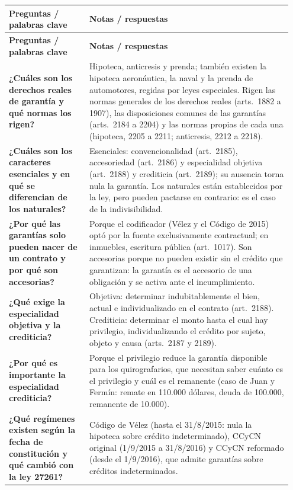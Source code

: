 \documentclass[12pt,oneside]{book}
\makeatletter
\newenvironment{cornell}{%
    \par\vspace{0.5em}
    \noindent
    \begin{longtable}{@{}>{\raggedright\arraybackslash}p{0.27\linewidth}
                         >{\raggedright\arraybackslash}p{0.68\linewidth}@{}}
    \toprule
    \textbf{Preguntas / palabras clave} & \textbf{Notas / respuestas} \\
    \midrule
    \endfirsthead
    \toprule
    \textbf{Preguntas / palabras clave} & \textbf{Notas / respuestas} \\
    \midrule
    \endhead
}{%
    \bottomrule
    \end{longtable}
}
\makeatother
\begin{document}
\begin{cornell}
\textbf{¿Cuáles son los derechos reales de garantía y qué normas los rigen?} &
Hipoteca, anticresis y prenda; también existen la hipoteca aeronáutica, la naval y la prenda de automotores, regidas por leyes especiales. Rigen las normas generales de los derechos reales (arts.~1882 a 1907), las disposiciones comunes de las garantías (arts.~2184 a 2204) y las normas propias de cada una (hipoteca, 2205 a 2211; anticresis, 2212 a 2218). \\

\textbf{¿Cuáles son los caracteres esenciales y en qué se diferencian de los naturales?} &
Esenciales: convencionalidad (art.~2185), accesoriedad (art.~2186) y especialidad objetiva (art.~2188) y crediticia (art.~2189); su ausencia torna nula la garantía. Los naturales están establecidos por la ley, pero pueden pactarse en contrario: es el caso de la indivisibilidad. \\

\textbf{¿Por qué las garantías solo pueden nacer de un contrato y por qué son accesorias?} &
Porque el codificador (Vélez y el Código de 2015) optó por la fuente exclusivamente contractual; en inmuebles, escritura pública (art.~1017). Son accesorias porque no pueden existir sin el crédito que garantizan: la garantía es el accesorio de una obligación y se activa ante el incumplimiento. \\

\textbf{¿Qué exige la especialidad objetiva y la crediticia?} &
Objetiva: determinar indubitablemente el bien, actual e individualizado en el contrato (art.~2188). Crediticia: determinar el monto hasta el cual hay privilegio, individualizando el crédito por sujeto, objeto y causa (arts.~2187 y 2189). \\

\textbf{¿Por qué es importante la especialidad crediticia?} &
Porque el privilegio reduce la garantía disponible para los quirografarios, que necesitan saber cuánto es el privilegio y cuál es el remanente (caso de Juan y Fermín: remate en 110.000 dólares, deuda de 100.000, remanente de 10.000). \\

\textbf{¿Qué regímenes existen según la fecha de constitución y qué cambió con la ley 27261?} &
Código de Vélez (hasta el 31/8/2015: nula la hipoteca sobre crédito indeterminado), CCyCN original (1/9/2015 a 31/8/2016) y CCyCN reformado (desde el 1/9/2016), que admite garantías sobre créditos indeterminados. \\


\end{cornell}
\end{document}
